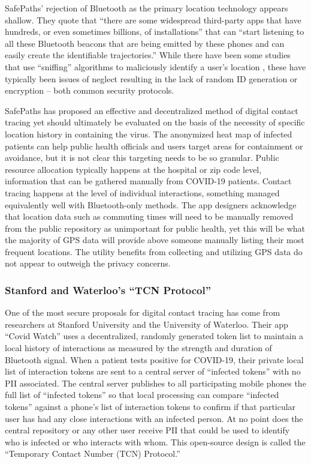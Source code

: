 \documentclass{article}
\begin{document}
SafePaths’ rejection of Bluetooth as the primary location technology appears shallow. They quote that “there are some widespread third-party apps that have hundreds, or even sometimes billions, of installations” that can “start listening to all these Bluetooth beacons that are being emitted by these phones and can easily create the identifiable trajectories.” \cite{Transparency} While there have been some studies that use “sniffing” algorithms to maliciously identify a user’s location \cite{VulnerableToTracking}, these have typically been issues of neglect resulting in the lack of random ID generation or encryption – both common security protocols.

SafePaths has proposed an effective and decentralized method of digital contact tracing yet should ultimately be evaluated on the basis of the necessity of specific location history in containing the virus. The anonymized heat map of infected patients can help public health officials and users target areas for containment or avoidance, but it is not clear this targeting needs to be so granular. Public resource allocation typically happens at the hospital or zip code level, information that can be gathered manually from COVID-19 patients. Contact tracing happens at the level of individual interactions, something managed equivalently well with Bluetooth-only methods. The app designers acknowledge that location data such as commuting times will need to be manually removed from the public repository as unimportant for public health, yet this will be what the majority of GPS data will provide above someone manually listing their most frequent locations. The utility benefits from collecting and utilizing GPS data do not appear to outweigh the privacy concerns.

\subsubsection{Stanford and Waterloo’s “TCN Protocol”}
One of the most secure proposals for digital contact tracing has come from researchers at Stanford University and the University of Waterloo. Their app “Covid Watch”\cite{CovidWatch} uses a decentralized, randomly generated token list to maintain a local history of interactions as measured by the strength and duration of Bluetooth signal. When a patient tests positive for COVID-19, their private local list of interaction tokens are sent to a central server of “infected tokens” with no PII associated. The central server publishes to all participating mobile phones the full list of “infected tokens” so that local processing can compare “infected tokens” against a phone’s list of interaction tokens to confirm if that particular user has had any close interactions with an infected person. At no point does the central repository or any other user receive PII that could be used to identify who is infected or who interacts with whom. This open-source design is called the “Temporary Contact Number (TCN) Protocol.” \cite{TCNProtocol}
\end{document}

